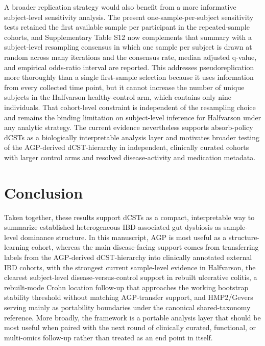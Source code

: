 \documentclass[
  11pt,
]{article}
\begin{document}
A broader replication strategy would also benefit from a more
informative subject-level sensitivity analysis. The present
one-sample-per-subject sensitivity tests retained the first available
sample per participant in the repeated-sample cohorts, and
Supplementary Table S12 now complements that summary with a
subject-level resampling consensus in which one sample per subject is
drawn at random across many iterations and the consensus rate, median
adjusted q-value, and empirical odds-ratio interval are reported. This
addresses pseudoreplication more thoroughly than a single first-sample
selection because it uses information from every collected time point,
but it cannot increase the number of unique subjects in the Halfvarson
healthy-control arm, which contains only nine individuals. That
cohort-level constraint is independent of the resampling choice and
remains the binding limitation on subject-level inference for
Halfvarson under any analytic strategy. The current evidence
nevertheless supports absorb-policy dCSTs as a biologically
interpretable analysis layer and motivates broader testing of the
AGP-derived dCST-hierarchy in independent, clinically curated cohorts
with larger control arms and resolved disease-activity and medication
metadata.

\section{Conclusion}\label{conclusion}

Taken together, these results support dCSTs as a compact, interpretable
way to summarize established heterogeneous IBD-associated gut dysbiosis
as sample-level dominance structure. In this manuscript, AGP is most
useful as a structure-learning cohort, whereas the main disease-facing
support comes from transferring labels from the AGP-derived
dCST-hierarchy into clinically annotated external IBD cohorts, with the
strongest current sample-level evidence in Halfvarson, the clearest
subject-level disease-versus-control support in rebuilt ulcerative
colitis, a rebuilt-mode Crohn location follow-up that approaches the
working bootstrap stability threshold without matching AGP-transfer
support, and HMP2/Gevers serving mainly as portability boundaries under
the canonical shared-taxonomy reference. More broadly,
the framework is a portable analysis layer that should be most useful
when paired with the next round of clinically curated, functional, or
multi-omics follow-up rather than treated as an end point in itself.
\end{document}
